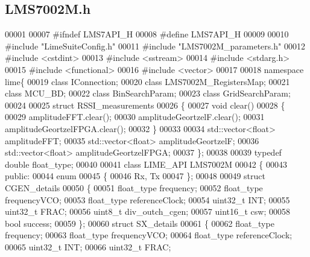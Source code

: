 \subsection{L\+M\+S7002\+M.\+h}
\label{LMS7002M_8h_source}

\begin{DoxyCode}
00001 
00007 \textcolor{preprocessor}{#ifndef LMS7API\_H}
00008 \textcolor{preprocessor}{#define LMS7API\_H}
00009 
00010 \textcolor{preprocessor}{#include "LimeSuiteConfig.h"}
00011 \textcolor{preprocessor}{#include "LMS7002M_parameters.h"}
00012 \textcolor{preprocessor}{#include <cstdint>}
00013 \textcolor{preprocessor}{#include <sstream>}
00014 \textcolor{preprocessor}{#include <stdarg.h>}
00015 \textcolor{preprocessor}{#include <functional>}
00016 \textcolor{preprocessor}{#include <vector>}
00017 
00018 \textcolor{keyword}{namespace }lime\{
00019 \textcolor{keyword}{class }IConnection;
00020 \textcolor{keyword}{class }LMS7002M\_RegistersMap;
00021 \textcolor{keyword}{class }MCU\_BD;
00022 \textcolor{keyword}{class }BinSearchParam;
00023 \textcolor{keyword}{class }GridSearchParam;
00024 
00025 \textcolor{keyword}{struct }RSSI_measurements
00026 \{
00027     \textcolor{keywordtype}{void} clear()
00028     \{
00029         amplitudeFFT.clear();
00030         amplitudeGeortzelF.clear();
00031         amplitudeGeortzelFPGA.clear();
00032     \}
00033 
00034     std::vector<float> amplitudeFFT;
00035     std::vector<float> amplitudeGeortzelF;
00036     std::vector<float> amplitudeGeortzelFPGA;
00037 \};
00038 
00039 \textcolor{keyword}{typedef} \textcolor{keywordtype}{double} float_type;
00040 
00041 \textcolor{keyword}{class }LIME_API LMS7002M
00042 \{
00043 \textcolor{keyword}{public}:
00044     \textcolor{keyword}{enum}
00045     \{
00046         Rx, Tx
00047     \};
00048 
00049     \textcolor{keyword}{struct }CGEN_details
00050     \{
00051         float\_type frequency;
00052         float\_type frequencyVCO;
00053         float\_type referenceClock;
00054         uint32\_t INT;
00055         uint32\_t FRAC;
00056         uint8\_t div_outch_cgen;
00057         uint16\_t csw;
00058         \textcolor{keywordtype}{bool} success;
00059     \};
00060     \textcolor{keyword}{struct }SX_details
00061     \{
00062         float\_type frequency;
00063         float\_type frequencyVCO;
00064         float\_type referenceClock;
00065         uint32\_t INT;
00066         uint32\_t FRAC;

\end{DoxyCode}
